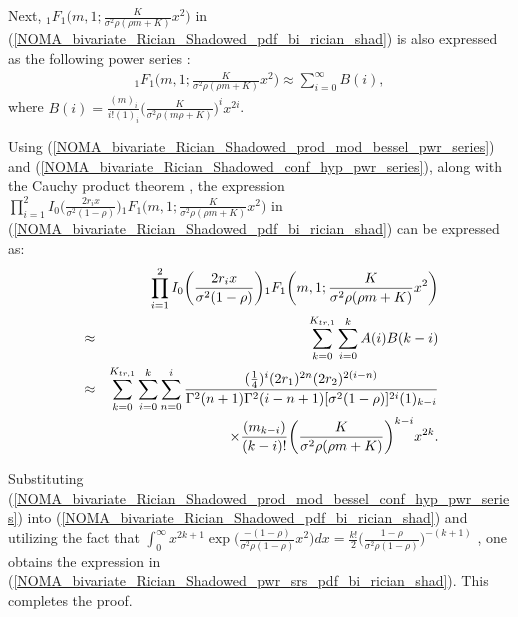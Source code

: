 Next, ${}_1{F_1}\big(m,1;\frac{K}{\sigma^2 \rho(\rho m + K)}x^2\big)$ in (\ref{NOMA_bivariate_Rician_Shadowed_pdf_bi_rician_shad}) is also expressed as the following power series \cite[eq. (13.1.2)]{abramowitz1964handbook}:
\begin{eqnarray} \label{NOMA_bivariate_Rician_Shadowed_conf_hyp_pwr_series}
{}_1{F_1}\bigg(m,1;\frac{K}{\sigma^2 \rho(\rho m + K)}x^2\bigg) \approx \sum_{i=0}^{\infty} B(i),
\end{eqnarray}
where $B(i) = \frac{(m)_i}{i!(1)_i}\big( \frac{K}{\sigma^2 \rho (m\rho+K)} \big)^i x^{2i}$. 

Using (\ref{NOMA_bivariate_Rician_Shadowed_prod_mod_bessel_pwr_series}) and (\ref{NOMA_bivariate_Rician_Shadowed_conf_hyp_pwr_series}), along with the Cauchy product theorem \cite[eq. (0.316)]{gradshteyn2014table}, the expression $\prod_{i=1}^2 I_0\big( \frac{2r_ix}{\sigma^2(1-\rho)} \big) {}_1{F_1}\big(m,1;\frac{K}{\sigma^2 \rho(\rho m + K)}x^2\big)$ in (\ref{NOMA_bivariate_Rician_Shadowed_pdf_bi_rician_shad}) can be expressed as:
\begin{eqnarray} \label{NOMA_bivariate_Rician_Shadowed_prod_mod_bessel_conf_hyp_pwr_series}
 & & \hspace{-3cm} \prod_{i=1}^2 I_0\bigg( \frac{2r_ix}{\sigma^2(1-\rho)} \bigg) {}_1{F_1}\bigg(m,1;\frac{K}{\sigma^2 \rho(\rho m + K)}x^2\bigg) \nonumber\\
 & \approx & \sum_{k=0}^{K_{tr,1}} \sum_{i=0}^{k} A(i) B(k-i) \nonumber \\
 & \approx & \sum_{k=0}^{K_{tr,1}} \sum_{i=0}^{k} \sum_{n=0}^{i} \frac{(\frac{1}{4})^i (2r_1)^{2n}(2r_2)^{2(i-n)}}{\Gamma^2(n+1)\Gamma^2(i-n+1)[\sigma^2(1-\rho)]^{2i}(1)_{k-i}} \nonumber \\
 & & \hspace{2.3cm} \times \frac{(m_{k-i})}{(k-i)!} \bigg(\frac{K}{\sigma^2 \rho (\rho m + K)}\bigg)^{k-i}x^{2k}.
\end{eqnarray}

Substituting (\ref{NOMA_bivariate_Rician_Shadowed_prod_mod_bessel_conf_hyp_pwr_series}) into (\ref{NOMA_bivariate_Rician_Shadowed_pdf_bi_rician_shad}) and utilizing the fact that $\int_0^{\infty} x^{2k+1} \exp\Big( \frac{-(1-\rho)}{\sigma^2 \rho(1-\rho)}x^2 \Big)dx = \frac{k!}{2}\Big(\frac{1-\rho}{\sigma^2 \rho(1-\rho)}\Big)^{-(k+1)}$ \cite[eq. (3.461.3)]{gradshteyn2014table}, one obtains the expression in (\ref{NOMA_bivariate_Rician_Shadowed_pwr_srs_pdf_bi_rician_shad}). This completes the proof.

